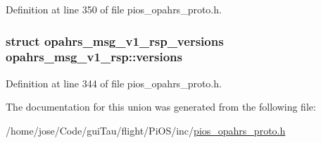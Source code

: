 Definition at line 350 of file pios\-\_\-opahrs\-\_\-proto.\-h.

\hypertarget{unionopahrs__msg__v1__rsp_afc10e960b1c0ce91b8ac14c6d926e2e2}{
\subsubsection[{versions}]{\setlength{\rightskip}{0pt plus 5cm}struct {\bf opahrs\-\_\-msg\-\_\-v1\-\_\-rsp\-\_\-versions} opahrs\-\_\-msg\-\_\-v1\-\_\-rsp\-::versions}}\label{unionopahrs__msg__v1__rsp_afc10e960b1c0ce91b8ac14c6d926e2e2}


Definition at line 344 of file pios\-\_\-opahrs\-\_\-proto.\-h.



The documentation for this union was generated from the following file\-:\begin{DoxyCompactItemize}
\item 
/home/jose/\-Code/gui\-Tau/flight/\-Pi\-O\-S/inc/\hyperlink{pios__opahrs__proto_8h}{pios\-\_\-opahrs\-\_\-proto.\-h}\end{DoxyCompactItemize}
